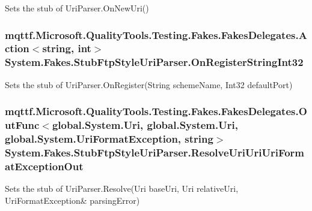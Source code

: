 Sets the stub of Uri\-Parser.\-On\-New\-Uri()

\hypertarget{class_system_1_1_fakes_1_1_stub_ftp_style_uri_parser_af2acafb505b3a764d8403c28e2e577af}{
\subsubsection[{On\-Register\-String\-Int32}]{\setlength{\rightskip}{0pt plus 5cm}mqttf.\-Microsoft.\-Quality\-Tools.\-Testing.\-Fakes.\-Fakes\-Delegates.\-Action$<$string, int$>$ System.\-Fakes.\-Stub\-Ftp\-Style\-Uri\-Parser.\-On\-Register\-String\-Int32}}\label{class_system_1_1_fakes_1_1_stub_ftp_style_uri_parser_af2acafb505b3a764d8403c28e2e577af}


Sets the stub of Uri\-Parser.\-On\-Register(\-String scheme\-Name, Int32 default\-Port)

\hypertarget{class_system_1_1_fakes_1_1_stub_ftp_style_uri_parser_aac2fa1edc7c0129f75bc7ae712e8a9d8}{
\subsubsection[{Resolve\-Uri\-Uri\-Uri\-Format\-Exception\-Out}]{\setlength{\rightskip}{0pt plus 5cm}mqttf.\-Microsoft.\-Quality\-Tools.\-Testing.\-Fakes.\-Fakes\-Delegates.\-Out\-Func$<$global.\-System.\-Uri, global.\-System.\-Uri, global.\-System.\-Uri\-Format\-Exception, string$>$ System.\-Fakes.\-Stub\-Ftp\-Style\-Uri\-Parser.\-Resolve\-Uri\-Uri\-Uri\-Format\-Exception\-Out}}\label{class_system_1_1_fakes_1_1_stub_ftp_style_uri_parser_aac2fa1edc7c0129f75bc7ae712e8a9d8}


Sets the stub of Uri\-Parser.\-Resolve(Uri base\-Uri, Uri relative\-Uri, Uri\-Format\-Exception\& parsing\-Error)



